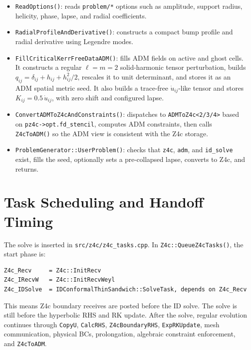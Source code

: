 \documentclass[11pt]{article}
\newcommand{\file}[1]{\nolinkurl{#1}}
\newcommand{\code}[1]{\texttt{#1}}
\begin{document}
\begin{itemize}
  \item \code{ReadOptions()}: reads \code{problem/*} options such as amplitude,
        support radius, helicity, phase, lapse, and radial coefficients.
  \item \code{RadialProfileAndDerivative()}: constructs a compact bump profile
        and radial derivative using Legendre modes.
  \item \code{FillCriticalKerrFreeDataADM()}: fills ADM fields on active and
        ghost cells.  It constructs a regular \(\ell=m=2\) solid-harmonic tensor
        perturbation, builds \(q_{ij}=\delta_{ij}+h_{ij}+h^2_{ij}/2\), rescales it
        to unit determinant, and stores it as an ADM spatial metric seed.  It also
        builds a trace-free \(\dot{u}_{ij}\)-like tensor and stores
        \(K_{ij}=0.5\,\dot{u}_{ij}\), with zero shift and configured lapse.
  \item \code{ConvertADMToZ4cAndConstraints()}: dispatches to
        \code{ADMToZ4c<2/3/4>} based on \code{pz4c->opt.fd\_stencil}, computes
        ADM constraints, then calls \code{Z4cToADM()} so the ADM view is
        consistent with the Z4c storage.
  \item \code{ProblemGenerator::UserProblem()}: checks that \code{z4c}, \code{adm},
        and \code{id\_solve} exist, fills the seed, optionally sets a
        pre-collapsed lapse, converts to Z4c, and returns.
\end{itemize}

\section{Task Scheduling and Handoff Timing}

The solve is inserted in \file{src/z4c/z4c\_tasks.cpp}.  In
\code{Z4c::QueueZ4cTasks()}, the start phase is:
\begin{lstlisting}
Z4c_Recv     = Z4c::InitRecv
Z4c_IRecvW   = Z4c::InitRecvWeyl
Z4c_IDSolve  = IDConformalThinSandwich::SolveTask, depends on Z4c_Recv
\end{lstlisting}

This means Z4c boundary receives are posted before the ID solve.  The solve is
still before the hyperbolic RHS and RK update.  After the solve, regular evolution
continues through \code{CopyU}, \code{CalcRHS}, \code{Z4cBoundaryRHS},
\code{ExpRKUpdate}, mesh communication, physical BCs, prolongation, algebraic
constraint enforcement, and \code{Z4cToADM}.
\end{document}
